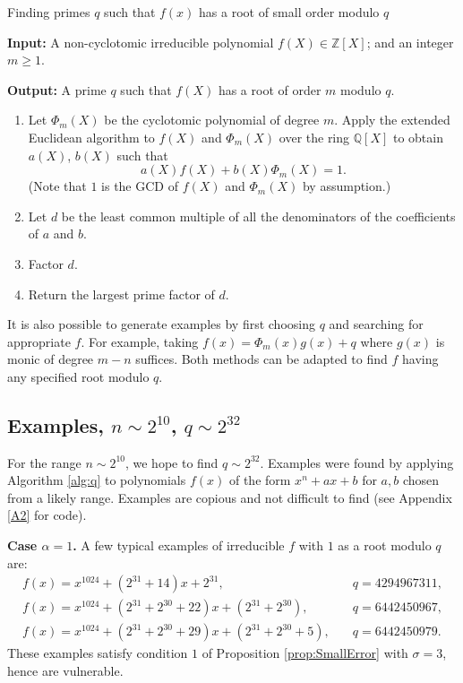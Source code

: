 \documentclass{llncs}
\newcommand{\QQ}{\mathbb{Q}}
\newcommand{\ZZ}{\mathbb{Z}}
\newcommand{\<}{\langle}
\renewcommand{\>}{\rangle}
\begin{document}
\begin{algorithm}[H]
			\caption{Finding primes $q$ such that $f(x)$ has a root of small order modulo $q$}
			\label{alg:q}
                        \raggedright
{\bf Input:} A non-cyclotomic irreducible polynomial $f(X) \in \ZZ[X]$; and an integer $m \ge 1$.

{\bf Output:} A prime $q$ such that $f(X)$ has a root of order $m$ modulo $q$.

\begin{enumerate}
        \item Let $\Phi_m(X)$ be the cyclotomic polynomial of degree $m$.  Apply the extended Euclidean algorithm to $f(X)$ and $\Phi_m(X)$ over the ring $\QQ[X]$ to obtain $a(X)$, $b(X)$ such that $$a(X)f(X) + b(X)\Phi_m(X) = 1.$$  (Note that $1$ is the GCD of $f(X)$ and $\Phi_m(X)$ by assumption.)
        \item Let $d$ be the least common multiple of all the denominators of the coefficients of $a$ and $b$.
        \item Factor $d$.
        \item Return the largest prime factor of $d$.
\end{enumerate}
\end{algorithm}

It is also possible to generate examples by first choosing $q$ and searching for appropriate $f$.  For example, taking
$f(x) = \Phi_m(x)g(x) + q$
where $g(x)$ is monic of degree $m-n$ suffices.
Both methods can be adapted to find $f$ having any specified root modulo $q$.

\subsection{Examples, $n \sim 2^{10}$, $q \sim 2^{32}$}
\label{sec:6examples}

For the range $n \sim 2^{10}$, we hope to find $q \sim 2^{32}$.  Examples were found by applying Algorithm \ref{alg:q} to polynomials $f(x)$ of the form
$x^n + ax + b$
for $a, b$ chosen from a likely range.  Examples are copious and not difficult to find (see Appendix \ref{A2} for code).

{\bf Case $\alpha=1$.}  A few typical examples of irreducible $f$ with $1$ as a root modulo $q$ are:
\vspace{-0.25em}
\begin{align*}
        f(x) = x^{1024} + (2^{31}+14)x + 2^{31}, &\quad q = 4294967311, \\
      f(x) = x^{1024} + (2^{31}+2^{30}+22)x + (2^{31}+2^{30}), &\quad q = 6442450967,  \\
     f(x) = x^{1024} + (2^{31}+2^{30}+29)x + (2^{31}+2^{30}+5), &\quad q = 6442450979.
\end{align*}
These examples satisfy condition $1$ of Proposition \ref{prop:SmallError} with $\sigma=3$, hence are vulnerable.%
\end{document}
